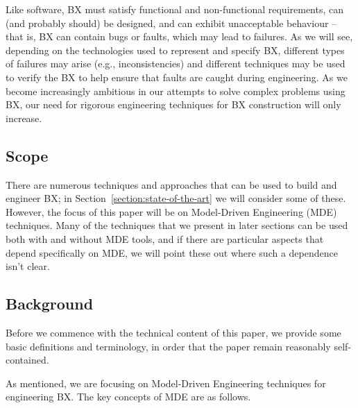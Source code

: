Like software, BX must satisfy functional and non-functional requirements, can (and probably should) be designed, and can exhibit unacceptable behaviour -- that is, BX can contain bugs or faults, which may lead to failures. As we will see, depending on the technologies used to represent and specify BX, different types of failures may arise (e.g., inconsistencies) and different techniques may be used to verify the BX to help ensure that faults are caught during engineering. As we become increasingly ambitious in our attempts to solve complex problems using BX, our need for rigorous engineering techniques for BX construction will only increase.

\subsection{Scope}
There are numerous techniques and approaches that can be used to build and engineer BX; in Section~\ref{section:state-of-the-art} we will consider some of these. However, the focus of this paper will be on Model-Driven Engineering (MDE) techniques. Many of the techniques that we present in later sections can be used both with and without MDE tools, and if there are particular aspects that depend specifically on MDE, we will point these out where such a dependence isn't clear.

\subsection{Background}
Before we commence with the technical content of this paper, we provide some basic definitions and terminology, in order that the paper remain reasonably self-contained.

As mentioned, we are focusing on Model-Driven Engineering techniques for engineering BX. The key concepts of MDE are as follows.

